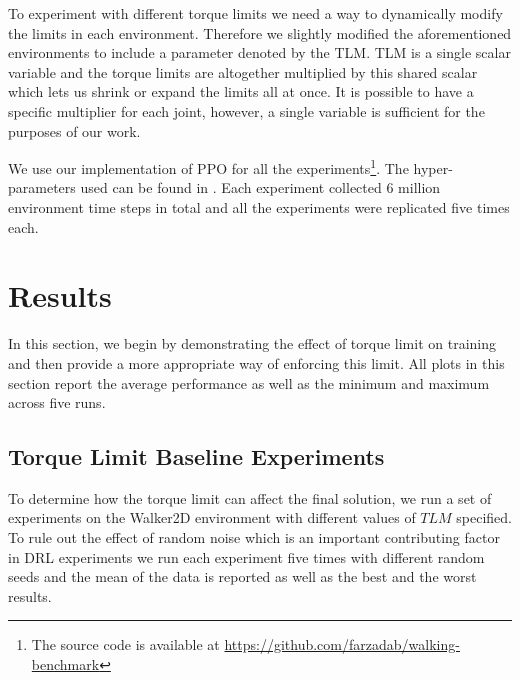 To experiment with different torque limits we need a way to dynamically modify the limits in each environment. Therefore we slightly modified the aforementioned environments to include a parameter denoted by the \ac{TLM}. \ac{TLM} is a single scalar variable and the torque limits are altogether multiplied by this shared scalar which lets us shrink or expand the limits all at once. It is possible to have a specific multiplier for each joint, however, a single variable is sufficient for the purposes of our work.

We use our implementation of PPO \cite{ppo} for all the experiments\footnote{The source code is available at \url{https://github.com/farzadab/walking-benchmark}}.
The hyper-parameters used can be found in .
Each experiment collected 6 million environment time steps in total and all the experiments were replicated five times each.





\section{Results}

In this section, we begin by demonstrating the effect of torque limit on training and then provide a more appropriate way of enforcing this limit.
All plots in this section report the average performance as well as the minimum and maximum across five runs.

\subsection{Torque Limit Baseline Experiments}

To determine how the torque limit can affect the final solution, we run a set of experiments on the Walker2D environment with different values of $TLM$ specified. To rule out the effect of random noise which is an important contributing factor in \ac{DRL} experiments \cite{rl_that_matters} we run each experiment five times with different random seeds and the mean of the data is reported as well as the best and the worst results.

